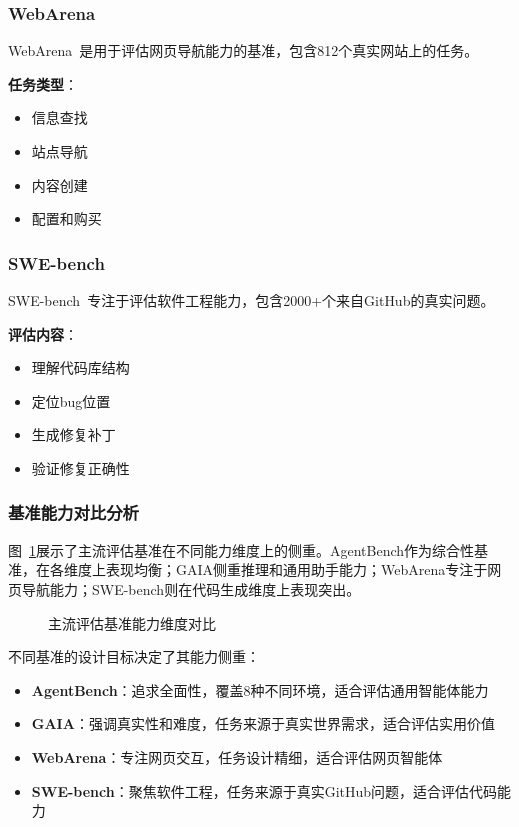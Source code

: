 \subsubsection{WebArena}

WebArena~\cite{zhou2023webarena}是用于评估网页导航能力的基准，包含812个真实网站上的任务。

\textbf{任务类型}：
\begin{itemize}[leftmargin=2em]
    \item 信息查找
    \item 站点导航
    \item 内容创建
    \item 配置和购买
\end{itemize}

\subsubsection{SWE-bench}

SWE-bench~\cite{jimenez2023swe}专注于评估软件工程能力，包含2000+个来自GitHub的真实问题。

\textbf{评估内容}：
\begin{itemize}[leftmargin=2em]
    \item 理解代码库结构
    \item 定位bug位置
    \item 生成修复补丁
    \item 验证修复正确性
\end{itemize}

\subsubsection{基准能力对比分析}

图~\ref{fig:benchmark-radar}展示了主流评估基准在不同能力维度上的侧重。AgentBench作为综合性基准，在各维度上表现均衡；GAIA侧重推理和通用助手能力；WebArena专注于网页导航能力；SWE-bench则在代码生成维度上表现突出。

\begin{figure}[htbp]
    \centering
    
    \caption{主流评估基准能力维度对比}
    \label{fig:benchmark-radar}
\end{figure}

不同基准的设计目标决定了其能力侧重：
\begin{itemize}[leftmargin=2em]
    \item \textbf{AgentBench}：追求全面性，覆盖8种不同环境，适合评估通用智能体能力
    \item \textbf{GAIA}：强调真实性和难度，任务来源于真实世界需求，适合评估实用价值
    \item \textbf{WebArena}：专注网页交互，任务设计精细，适合评估网页智能体
    \item \textbf{SWE-bench}：聚焦软件工程，任务来源于真实GitHub问题，适合评估代码能力
\end{itemize}

